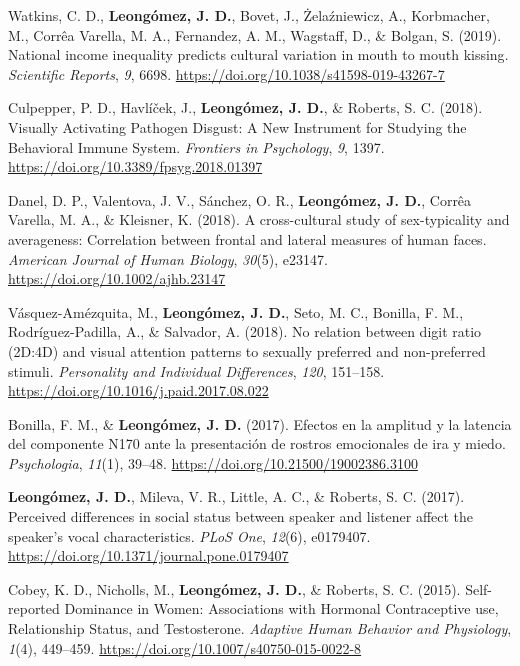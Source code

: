 \documentclass[11pt, a4paper]{awesome-cv}
\begin{document}
\leavevmode{}%
Watkins, C. D., \textbf{Leongómez, J. D.}, Bovet, J., Żelaźniewicz, A.,
Korbmacher, M., Corrêa Varella, M. A., Fernandez, A. M., Wagstaff, D.,
\& Bolgan, S. (2019). {National income inequality predicts cultural
variation in mouth to mouth kissing}. \emph{Scientific Reports},
\emph{9}, 6698. \url{https://doi.org/10.1038/s41598-019-43267-7}

\leavevmode{}%
Culpepper, P. D., Havlíček, J., \textbf{Leongómez, J. D.}, \& Roberts,
S. C. (2018). {Visually Activating Pathogen Disgust: A New Instrument
for Studying the Behavioral Immune System}. \emph{Frontiers in
Psychology}, \emph{9}, 1397.
\url{https://doi.org/10.3389/fpsyg.2018.01397}

\leavevmode{}%
Danel, D. P., Valentova, J. V., Sánchez, O. R.,
\textbf{Leongómez, J. D.}, Corrêa Varella, M. A., \& Kleisner, K.
(2018). {A cross-cultural study of sex-typicality and averageness:
Correlation between frontal and lateral measures of human faces}.
\emph{American Journal of Human Biology}, \emph{30}(5), e23147.
\url{https://doi.org/10.1002/ajhb.23147}

\leavevmode{}%
Vásquez-Amézquita, M., \textbf{Leongómez, J. D.}, Seto, M. C., Bonilla,
F. M., Rodríguez-Padilla, A., \& Salvador, A. (2018). {No relation
between digit ratio (2D:4D) and visual attention patterns to sexually
preferred and non-preferred stimuli}. \emph{Personality and Individual
Differences}, \emph{120}, 151--158.
\url{https://doi.org/10.1016/j.paid.2017.08.022}

\leavevmode{}%
Bonilla, F. M., \& \textbf{Leongómez, J. D.} (2017). {Efectos en la
amplitud y la latencia del componente N170 ante la presentaci{ó}n de
rostros emocionales de ira y miedo}. \emph{Psychologia}, \emph{11}(1),
39--48. \url{https://doi.org/10.21500/19002386.3100}

\leavevmode{}%
\textbf{Leongómez, J. D.}, Mileva, V. R., Little, A. C., \& Roberts, S.
C. (2017). {Perceived differences in social status between speaker and
listener affect the speaker's vocal characteristics}. \emph{PLoS One},
\emph{12}(6), e0179407.
\url{https://doi.org/10.1371/journal.pone.0179407}

\leavevmode{}%
Cobey, K. D., Nicholls, M., \textbf{Leongómez, J. D.}, \& Roberts, S. C.
(2015). {Self-reported Dominance in Women: Associations with Hormonal
Contraceptive use, Relationship Status, and Testosterone}.
\emph{Adaptive Human Behavior and Physiology}, \emph{1}(4), 449--459.
\url{https://doi.org/10.1007/s40750-015-0022-8}
\end{document}
